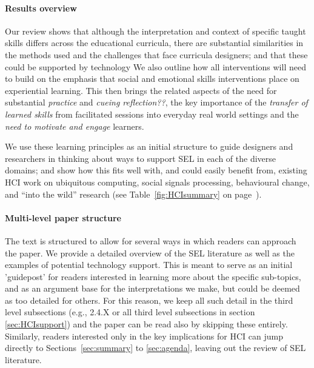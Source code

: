\documentclass[prodmode,acmtochi]{acmsmall}
\begin{document}
\paragraph{Results overview}
Our review shows that although the interpretation and context of specific taught skills  differs across the educational curricula, there are substantial similarities in the methods used and the challenges that face curricula designers; and that these could be supported by technology
%
We also outline how all interventions will need to build on the emphasis that social and emotional skills interventions place on experiential learning. This then brings the related aspects of the need for substantial \emph{practice} and \emph{cueing reflection??}, the key importance of the \emph{transfer of learned skills} from facilitated sessions into everyday real world settings and the \emph{need to motivate and engage} learners.

We use these learning principles as an initial structure to guide designers and researchers in thinking about ways to support SEL in each of the diverse domains; and show how this fits well with, and could easily benefit from, existing HCI work on ubiquitous computing, social signals processing, behavioural change, and ``into the wild'' research (see Table~\ref{fig:HCIsummary} on page~\pageref{fig:HCIsummary}). 
%

\paragraph{Multi-level paper structure}
The text is structured to allow for several ways in which readers can approach the paper. We provide a detailed overview of the SEL literature as well as the examples of potential technology support. This is meant to serve as an initial 'guidepost' for readers interested in learning more about the specific sub-topics, and as an argument base for the interpretations we make, but could be deemed as too detailed for others. For this reason, we keep all such detail in the third level subsections (e.g., 2.4.X or all third level subsections in section \ref{sec:HCIsupport}) and the paper can be read also by skipping these entirely. Similarly, readers interested only in the key implications for HCI can jump directly to Sections~\ref{sec:summary} to \ref{sec:agenda}, leaving out the review of SEL literature. 
\end{document}
